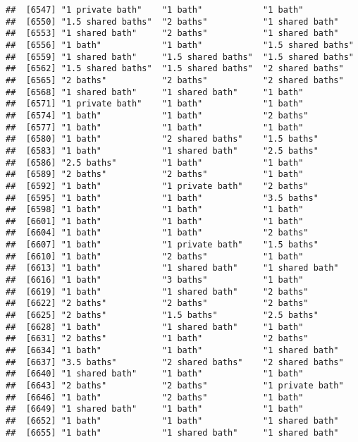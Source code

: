 \documentclass[
]{article}
\begin{document}
\begin{verbatim}
##  [6547] "1 private bath"    "1 bath"            "1 bath"           
##  [6550] "1.5 shared baths"  "2 baths"           "1 shared bath"    
##  [6553] "1 shared bath"     "2 baths"           "1 shared bath"    
##  [6556] "1 bath"            "1 bath"            "1.5 shared baths" 
##  [6559] "1 shared bath"     "1.5 shared baths"  "1.5 shared baths" 
##  [6562] "1.5 shared baths"  "1.5 shared baths"  "2 shared baths"   
##  [6565] "2 baths"           "2 baths"           "2 shared baths"   
##  [6568] "1 shared bath"     "1 shared bath"     "1 bath"           
##  [6571] "1 private bath"    "1 bath"            "1 bath"           
##  [6574] "1 bath"            "1 bath"            "2 baths"          
##  [6577] "1 bath"            "1 bath"            "1 bath"           
##  [6580] "1 bath"            "2 shared baths"    "1.5 baths"        
##  [6583] "1 bath"            "1 shared bath"     "2.5 baths"        
##  [6586] "2.5 baths"         "1 bath"            "1 bath"           
##  [6589] "2 baths"           "2 baths"           "1 bath"           
##  [6592] "1 bath"            "1 private bath"    "2 baths"          
##  [6595] "1 bath"            "1 bath"            "3.5 baths"        
##  [6598] "1 bath"            "1 bath"            "1 bath"           
##  [6601] "1 bath"            "1 bath"            "1 bath"           
##  [6604] "1 bath"            "1 bath"            "2 baths"          
##  [6607] "1 bath"            "1 private bath"    "1.5 baths"        
##  [6610] "1 bath"            "2 baths"           "1 bath"           
##  [6613] "1 bath"            "1 shared bath"     "1 shared bath"    
##  [6616] "1 bath"            "3 baths"           "1 bath"           
##  [6619] "1 bath"            "1 shared bath"     "2 baths"          
##  [6622] "2 baths"           "2 baths"           "2 baths"          
##  [6625] "2 baths"           "1.5 baths"         "2.5 baths"        
##  [6628] "1 bath"            "1 shared bath"     "1 bath"           
##  [6631] "2 baths"           "1 bath"            "2 baths"          
##  [6634] "1 bath"            "1 bath"            "1 shared bath"    
##  [6637] "3.5 baths"         "2 shared baths"    "2 shared baths"   
##  [6640] "1 shared bath"     "1 bath"            "1 bath"           
##  [6643] "2 baths"           "2 baths"           "1 private bath"   
##  [6646] "1 bath"            "2 baths"           "1 bath"           
##  [6649] "1 shared bath"     "1 bath"            "1 bath"           
##  [6652] "1 bath"            "1 bath"            "1 shared bath"    
##  [6655] "1 bath"            "1 shared bath"     "1 shared bath"    

\end{verbatim}
\end{document}
